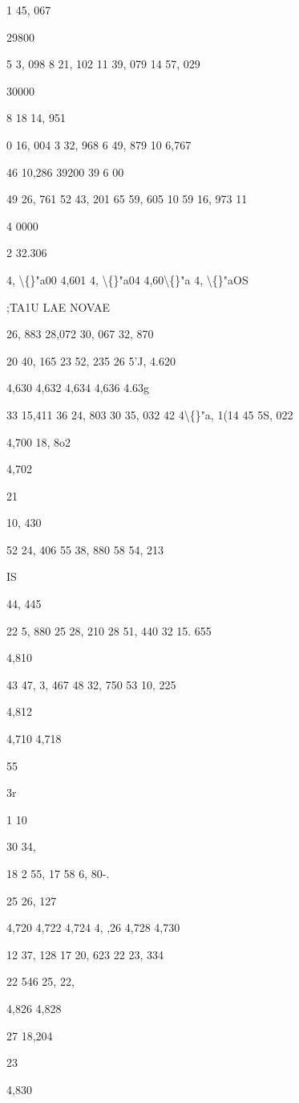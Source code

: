 \documentclass[10pt,a4paper]{article}
\begin{document}
1 45, 067

29800

5 3, 098
8 21, 102
11 39, 079
14 57, 029

30000

8 18 14, 951

0 16, 004
3 32, 968
6 49, 879
10
6,767

46 10,286
39200
39 6 00

49 26, 761
52 43, 201
65 59, 605
10 59 16, 973
11

4 0000

2 32.306

\newpage

4, \textbackslash\{\}"a00
4,601
4, \textbackslash\{\}"a04
4,60\textbackslash\{\}"a
4, \textbackslash\{\}"aOS

;TA1U LAE NOVAE

26, 883
28,072
30, 067
32, 870

20 40, 165
23 52, 235
26 5'J,
4.620

4,630
4,632
4,634
4,636
4.63g

33 15,411
36 24, 803
30 35, 032
42 4\textbackslash\{\}"a, 1(14
45 5S, 022

4,700
18, 8o2

4,702

21

10, 430

52 24, 406
55 38, 880
58 54, 213

IS

44, 445

22 5, 880
25 28, 210
28 51, 440
32 15. 655

4,810

43 47,
3, 467
48 32, 750
53 10, 225

4,812

4,710
4,718

55

3r

1 10

30 34,

18
2 55,
17 58
6, 80-.

25 26, 127

4,720
4,722
4,724
4, ,26
4,728
4,730

12 37, 128
17 20, 623
22 23, 334

22 546 25,
22,

4,826
4,828

27 18,204

23

4,830
\end{document}

